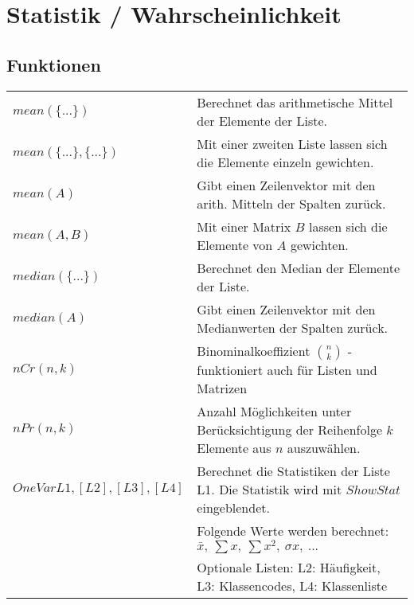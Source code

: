 \section{Statistik / Wahrscheinlichkeit}

\subsection{Funktionen}
\begin{tabular}{|l|l|}
	\hline
	$mean(\{...\})$				& Berechnet das arithmetische Mittel der Elemente der Liste. \\
	$mean(\{...\},\{...\})$		& Mit einer zweiten Liste lassen sich die Elemente einzeln gewichten. \\ \hline
	$mean(A)$					& Gibt einen Zeilenvektor mit den arith. Mitteln der Spalten zurück. \\ 
	$mean(A,B)$					& Mit einer Matrix $B$ lassen sich die Elemente von $A$ gewichten. \\ \hline
	$median(\{...\})$			& Berechnet den Median der Elemente der Liste. \\
	$median(A)$					& Gibt einen Zeilenvektor mit den Medianwerten der Spalten zurück. \\ \hline
	$nCr(n,k)$					& Binominalkoeffizient $\binom{n}{k}$ - funktioniert auch für Listen und Matrizen	\\ \hline
	$nPr(n,k)$					& Anzahl Möglichkeiten unter Berücksichtigung der Reihenfolge $k$ Elemente aus $n$ auszuwählen. \\ \hline
	$OneVar L1,[L2],[L3],[L4]$	& Berechnet die Statistiken der Liste L1. Die Statistik wird mit $ShowStat$ eingeblendet. \\
								& Folgende Werte werden berechnet: $ \bar x, \: \sum x, \: \sum x^2, \: \sigma x, \: ...$ \\
								& Optionale Listen: L2: Häufigkeit, L3: Klassencodes, L4: Klassenliste \\ \hline
\end{tabular}

